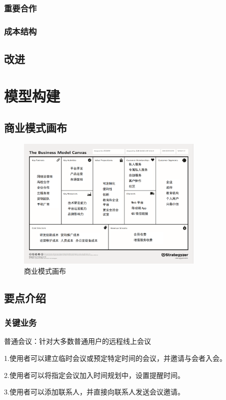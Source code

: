 \documentclass[a4paper,12pt]{article}
\begin{document}
    \subsubsection{重要合作}
    \subsubsection{成本结构}
    \subsection{改进}
    \section{模型构建}
    \subsection{商业模式画布}
    \begin{figure}[h]
        \centering
        \includegraphics[width=0.8\textwidth]{第3次商业模式画布.png}
        \caption{商业模式画布}
    \end{figure}
    \clearpage
    \subsection{要点介绍}
    \subsubsection{关键业务}
    \noindent 普通会议：针对大多数普通用户的远程线上会议

    1.使用者可以建立临时会议或预定特定时间的会议，并邀请与会者入会。

    2.使用者可以将指定会议加入时间规划中，设置提醒时间。

    3.使用者可以添加联系人，并直接向联系人发送会议邀请。
\end{document}

